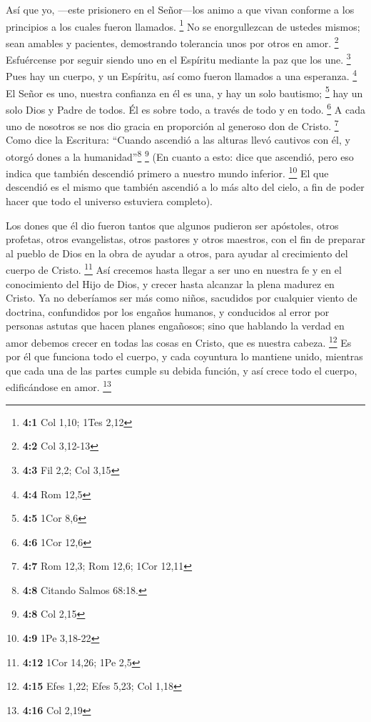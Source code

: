  Así que yo, ---este prisionero en el Señor---los animo a
que vivan conforme a los principios a los cuales fueron llamados.
\footnote{\textbf{4:1} Col 1,10; 1Tes 2,12}  No se
enorgullezcan de ustedes mismos; sean amables y pacientes, demostrando
tolerancia unos por otros en amor. \footnote{\textbf{4:2} Col 3,12-13}
 Esfuércense por seguir siendo uno en el Espíritu mediante
la paz que los une. \footnote{\textbf{4:3} Fil 2,2; Col 3,15}
 Pues hay un cuerpo, y un Espíritu, así como fueron
llamados a una esperanza. \footnote{\textbf{4:4} Rom 12,5}
 El Señor es uno, nuestra confianza en él es una, y hay un
solo bautismo; \footnote{\textbf{4:5} 1Cor 8,6}  hay un
solo Dios y Padre de todos. Él es sobre todo, a través de todo y en
todo. \footnote{\textbf{4:6} 1Cor 12,6}  A cada uno de
nosotros se nos dio gracia en proporción al generoso don de Cristo.
\footnote{\textbf{4:7} Rom 12,3; Rom 12,6; 1Cor 12,11} 
Como dice la Escritura: ``Cuando ascendió a las alturas llevó cautivos
con él, y otorgó dones a la humanidad''\footnote{\textbf{4:8} Citando
  Salmos 68:18.} \footnote{\textbf{4:8} Col 2,15}  (En
cuanto a esto: dice que ascendió, pero eso indica que también descendió
primero a nuestro mundo inferior. \footnote{\textbf{4:9} 1Pe 3,18-22}
 El que descendió es el mismo que también ascendió a lo
más alto del cielo, a fin de poder hacer que todo el universo estuviera
completo).

 Los dones que él dio fueron tantos que algunos pudieron
ser apóstoles, otros profetas, otros evangelistas, otros pastores y
otros maestros,  con el fin de preparar al pueblo de Dios
en la obra de ayudar a otros, para ayudar al crecimiento del cuerpo de
Cristo. \footnote{\textbf{4:12} 1Cor 14,26; 1Pe 2,5}  Así
crecemos hasta llegar a ser uno en nuestra fe y en el conocimiento del
Hijo de Dios, y crecer hasta alcanzar la plena madurez en Cristo.
 Ya no deberíamos ser más como niños, sacudidos por
cualquier viento de doctrina, confundidos por los engaños humanos, y
conducidos al error por personas astutas que hacen planes engañosos;
 sino que hablando la verdad en amor debemos crecer en
todas las cosas en Cristo, que es nuestra cabeza. \footnote{\textbf{4:15}
  Efes 1,22; Efes 5,23; Col 1,18}  Es por él que funciona
todo el cuerpo, y cada coyuntura lo mantiene unido, mientras que cada
una de las partes cumple su debida función, y así crece todo el cuerpo,
edificándose en amor. \footnote{\textbf{4:16} Col 2,19}

